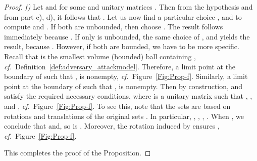\documentclass[12pt,draftcls,onecolumn]{IEEEtran}
\newcommand{\cf}{{\textit{cf.}}}
\begin{document}
{\begin{proof}
\textit{f)} Let  and  for some  and unitary matrices . Then from the hypothesis and from part c), d), it follows that . Let us now find a particular choice , and  to compute  and . If both  are unbounded, then choose . The result follows immediately because . If only  is unbounded, the same choice of , and  yields the result, because . However, if both  are bounded, we have to be more specific. Recall that  is the smallest volume (bounded) ball containing , \cf~Definition~\ref{def:adversary_attackmodel}. Therefore,  a limit point  at the boundary of  such that ,  is nonempty, \cf~Figure~\ref{Fig:Prop-f}. Similarly,  a limit point  at the boundary of  such that ,  is nonempty. Then by construction,  and  satisfy the required necessary conditions, where  is a unitary matrix such that , , and , \cf~Figure~\ref{Fig:Prop-f}. To see this, note that the sets  are based on rotations and translations of the original sets . In particular, , , , . When , we conclude that  and, so is . Moreover, the rotation induced by  ensures , \cf~Figure~\ref{Fig:Prop-f}.

\noindent This completes the proof of the Proposition.
\end{proof}
}
\end{document}
